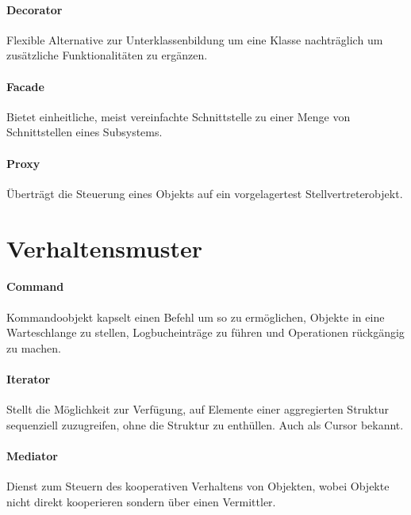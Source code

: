 \paragraph{Decorator}\label{decorator}

Flexible Alternative zur Unterklassenbildung um eine Klasse nachträglich um
zusätzliche Funktionalitäten zu ergänzen.

\paragraph{Facade}\label{facade}

Bietet einheitliche, meist vereinfachte Schnittstelle zu einer Menge von
Schnittstellen eines Subsystems.

\paragraph{Proxy}\label{proxy}

Überträgt die Steuerung eines Objekts auf ein vorgelagertest
Stellvertreterobjekt.

\section{Verhaltensmuster}\label{verhaltensmuster}

\paragraph{Command}\label{command}

Kommandoobjekt kapselt einen Befehl um so zu ermöglichen, Objekte in eine
Warteschlange zu stellen, Logbucheinträge zu führen und Operationen rückgängig zu
machen.

\paragraph{Iterator}\label{iterator}

Stellt die Möglichkeit zur Verfügung, auf Elemente einer aggregierten Struktur
sequenziell zuzugreifen, ohne die Struktur zu enthüllen. Auch als Cursor
bekannt.

\paragraph{Mediator}\label{mediator}

Dienst zum Steuern des kooperativen Verhaltens von Objekten, wobei Objekte
nicht direkt kooperieren sondern über einen Vermittler.

